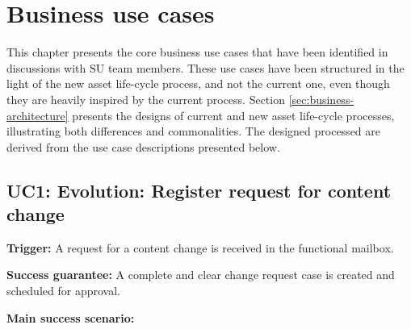 \chapter{Business use cases}
\label{sec:business-use cases}
	
	This chapter presents the core business use cases that have been identified in discussions with SU team members. These use cases have been structured in the light of the new asset life-cycle process, and not the current one, even though they are heavily inspired by the current process. Section \ref{sec:business-architecture} presents the designs of current and new asset life-cycle processes, illustrating both differences and commonalities. The designed processed are derived from the use case descriptions presented below. 
	
	\section{UC1: Evolution: Register request for content change}
	\label{sec:uc1}
	
	\textbf{Trigger:} A request for a content change is received in the functional mailbox.
	
	\textbf{Success guarantee:} A complete and clear change request case is created and scheduled for approval.
	
	\textbf{Main success scenario:}
	
